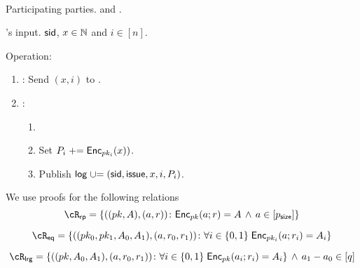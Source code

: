 \begin{protocol}~\label{prot:ConfidentialTransactions:Issue}
	\item[Participating parties.] \Ic and \Cc.
	
	
	\item[\Cc's input.] $\mathsf{sid}$, $x\in {\mathbb{N}}$ and $i\in [n]$.
	
	\item Operation:
	
	
	\begin{enumerate}
		
		\item   \Ic: Send $(x,i)$ to \Cc.
		
		\item \Cc:  
		\begin{enumerate}
			\item {}
			
			\item Set $P_i \mathrel{+}= \mathsf{Enc}_{pk_i}(x))$.
				
		\item Publish $\mathsf{log} \mathrel{\cup}= (\mathsf{sid},\mathsf{issue},x,i,P_i)$.
				 	
		\end{enumerate}
		
	\end{enumerate}
\end{protocol}


\newcommand{\RPs}{{\sf rp}}
\newcommand{\rRP}{\cR_\RPs}

\newcommand{\rRPDef}
{
	\set{((pk,A),(a,r))\colon \Enc_{pk}(a;r)= A \sland a\in [\psize]}
}


\newcommand{\Eqs}{{\sf eq}}
\newcommand{\rEQ}{\cR_\Eqs}

\newcommand{\rEQDef}
{
	\set{((pk_0,pk_1,A_0,A_1),(a,r_0,r_1))\colon \forall i\in \zo \; \Enc_{pk_i}(a;r_i)= A_i}
}

\newcommand{\Lrgs}{{\sf lrg}}
\newcommand{\rLrg}{\cR_\Lrgs}

\newcommand{\rLrgDef}
{
	\set{((pk,A_0,A_1),(a,r_0,r_1))\colon \forall i\in \zo \; \Enc_{pk}(a_i;r_i)= A_i} \sland a_1 -a_0 \in [q] 
}

We use proofs for the   following  relations  
$$\rRP =\rRPDef$$

$$\rEQ =\rEQDef$$


$$\rLrg =\rLrgDef$$

